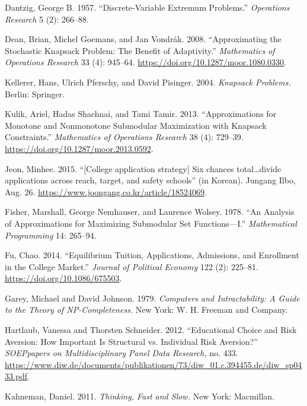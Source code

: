 \documentclass[11pt]{article} %
\theoremstyle{definition}
\theoremstyle{definition}
\begin{document}
Dantzig, George B. 1957. ``Discrete-Variable Extremum Problems.'' \emph{Operations Research} 5 (2): 266--88.

Dean, Brian, Michel Goemans, and Jan Vondr\'ak. 2008. ``Approximating the Stochastic Knapsack Problem: The Benefit of Adaptivity.'' \emph{Mathematics of Operations Research} 33 (4): 945--64. \url{https://doi.org/10.1287/moor.1080.0330}.

Kellerer, Hans, Ulrich Pferschy, and David Pisinger. 2004. \emph{Knapsack Problems.} Berlin: Springer.

Kulik, Ariel, Hadas Shachnai, and Tami Tamir. 2013. ``Approximations for Monotone and Nonmonotone Submodular Maximization with Knapsack Constraints.'' \emph{Mathematics of Operations Research} 38 (4): 729--39. \url{https://doi.org/10.1287/moor.2013.0592}.

\ifen Jeon, Minhee. 2015. ``[College application strategy] Six chances total\dots divide applications across reach, target, and safety schools'' (in Korean). Jungang Ilbo, Aug. 26. \url{https://www.joongang.co.kr/article/18524069}.\fi

Fisher, Marshall, George Nemhauser, and Laurence Wolsey. 1978. ``An Analysis of Approximations for Maximizing Submodular Set Functions—I.'' \emph{Mathematical Programming} 14: 265--94. 


Fu, Chao. 2014. ``Equilibrium Tuition, Applications, Admissions, and Enrollment in the College Market.'' \emph{Journal of Political Economy} 122 (2): 225--81. \url{https://doi.org/10.1086/675503}. 

Garey, Michael and David Johnson. 1979. \emph{Computers and Intractability: A Guide to the Theory of NP-Completeness.} New York: W. H. Freeman and Company. 

Hartlaub, Vanessa and Thorsten Schneider. 2012. “Educational Choice and Risk Aversion: How Important Is Structural vs. Individual Risk Aversion?” \emph{SOEPpapers on Multidisciplinary Panel Data Research,} no. 433. \url{https://www.diw.de/documents/publikationen/73/diw_01.c.394455.de/diw_sp0433.pdf}.

Kahneman, Daniel. 2011. \emph{Thinking, Fast and Slow.} New York: Macmillan.
\end{document}
